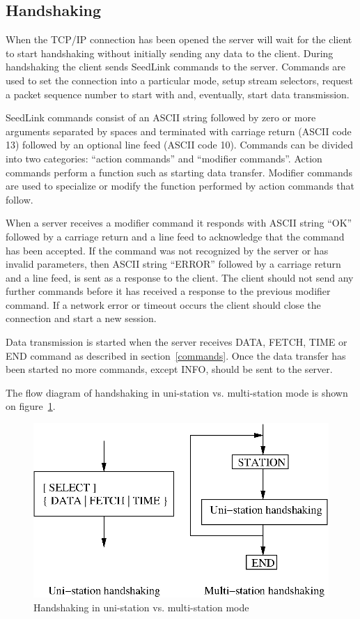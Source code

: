 \documentclass[11pt,a4paper,titlepage]{article}
\begin{document}
\subsection{Handshaking}

When the TCP/IP connection has been opened the server will wait for
the client to start handshaking without initially sending any data to
the client. During handshaking the client sends SeedLink commands to
the server. Commands are used to set the connection into a particular
mode, setup stream selectors, request a packet sequence number to
start with and, eventually, start data transmission.

SeedLink commands consist of an ASCII string followed by zero or more
arguments separated by spaces and terminated with carriage return
(ASCII code 13) followed by an optional line feed (ASCII code
10). Commands can be divided into two categories: ``action commands''
and ``modifier commands''.  Action commands perform a function such as
starting data transfer. Modifier commands are used to specialize or
modify the function performed by action commands that follow.

When a server receives a modifier command it responds with ASCII
string ``OK'' followed by a carriage return and a line feed to
acknowledge that the command has been accepted. If the command was not
recognized by the server or has invalid parameters, then ASCII string
``ERROR'' followed by a carriage return and a line feed, is sent as a
response to the client. The client should not send any further
commands before it has received a response to the previous modifier
command. If a network error or timeout occurs the client should close
the connection and start a new session.

Data transmission is started when the server receives DATA, FETCH, TIME or
END command as described in section~\ref{commands}. Once the data transfer
has been started no more commands, except INFO, should be sent to the
server.

The flow diagram of handshaking in uni-station vs. multi-station mode is
shown on figure~\ref{handshaking}.

\begin{figure}[ht]
\centering
\includegraphics{handshaking.eps}
\caption{Handshaking in uni-station vs. multi-station mode} \label{handshaking}
\end{figure}
\end{document}
